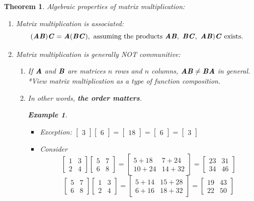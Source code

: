 \documentclass[12pt, a4paper]{article}
\newtheorem{thm}{Theorem}[subsection]
\newtheorem{eg}{Example}[subsection]
\def\matrixA{\textbf{\emph{A}}}
\def\matrixB{\textbf{\emph{B}}}
\begin{document}
\begin{thm}
Algebraic properties of matrix multiplication: 
\begin{enumerate}
	\item Matrix multiplication is associated: 
	\[(\matrixA\matrixB)\textbf{\emph{C}}=\matrixA(\matrixB\textbf{\emph{C}}),\text{ assuming the products }\matrixA\matrixB,\ \matrixB\textbf{\emph{C}},\ \matrixA\matrixB)\textbf{\emph{C}}\text{ exists.}\]
	\item Matrix multiplication is generally NOT communitive: 
	\begin{enumerate}
		\item If $\matrixA$ and $\matrixB$ are matrices $n$ rows and $n$ columns, $\matrixA\matrixB\neq\matrixB\matrixA$ in general. 
		*View matrix multiplication as a type of function composition. 
		\item In other words, \textbf{the order matters}.
		\begin{eg}
		\begin{itemize}
			\item Exception: $\begin{bmatrix}3\end{bmatrix}\begin{bmatrix}6\end{bmatrix}=\begin{bmatrix}18\end{bmatrix}=\begin{bmatrix}6\end{bmatrix}=\begin{bmatrix}3\end{bmatrix}$	
			\item Consider
			\[\begin{bmatrix}1&3\\2&4\end{bmatrix}\begin{bmatrix}5&7\\6&8\end{bmatrix}=\begin{bmatrix}5+18&7+24\\10+24&14+32\end{bmatrix}=\begin{bmatrix}23&31\\34&46\end{bmatrix}\]
			\[\begin{bmatrix}5&7\\6&8\end{bmatrix}\begin{bmatrix}1&3\\2&4\end{bmatrix}=\begin{bmatrix}5+14&15+28\\6+16&18+32\end{bmatrix}=\begin{bmatrix}19&43\\22&50\end{bmatrix}\]

\end{itemize}
\end{eg}
\end{enumerate}
\end{enumerate}
\end{thm}
\end{document}
